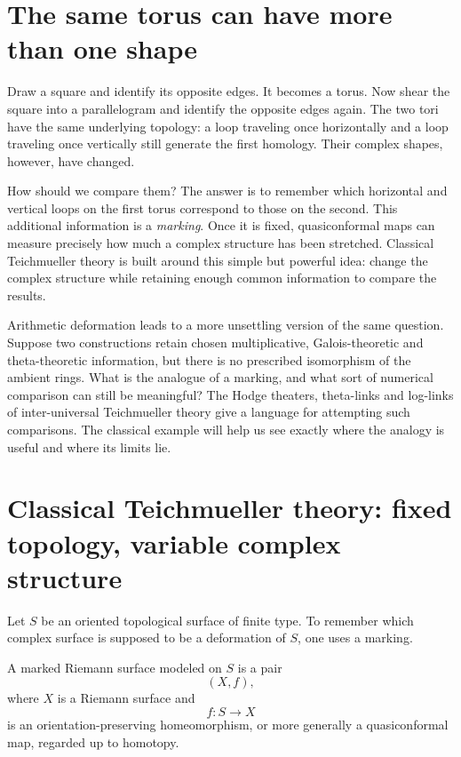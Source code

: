 
\section{The same torus can have more than one shape}

Draw a square and identify its opposite edges. It becomes a torus. Now shear the square into a parallelogram and identify the opposite edges again. The two tori have the same underlying topology: a loop traveling once horizontally and a loop traveling once vertically still generate the first homology. Their complex shapes, however, have changed.

How should we compare them? The answer is to remember which horizontal and vertical loops on the first torus correspond to those on the second. This additional information is a \emph{marking}. Once it is fixed, quasiconformal maps can measure precisely how much a complex structure has been stretched. Classical Teichmueller theory is built around this simple but powerful idea: change the complex structure while retaining enough common information to compare the results.

Arithmetic deformation leads to a more unsettling version of the same question. Suppose two constructions retain chosen multiplicative, Galois-theoretic and theta-theoretic information, but there is no prescribed isomorphism of the ambient rings. What is the analogue of a marking, and what sort of numerical comparison can still be meaningful? The Hodge theaters, theta-links and log-links of inter-universal Teichmueller theory give a language for attempting such comparisons. The classical example will help us see exactly where the analogy is useful and where its limits lie.

\section{Classical Teichmueller theory: fixed topology, variable complex structure}

Let \(S\) be an oriented topological surface of finite type.  To remember which complex surface is supposed to be a deformation of \(S\), one uses a marking.

\begin{definition}
A marked Riemann surface modeled on \(S\) is a pair
\[
  (X,f),
\]
where \(X\) is a Riemann surface and
\[
  f:S\longrightarrow X
\]
is an orientation-preserving homeomorphism, or more generally a quasiconformal map, regarded up to homotopy.
\end{definition}

